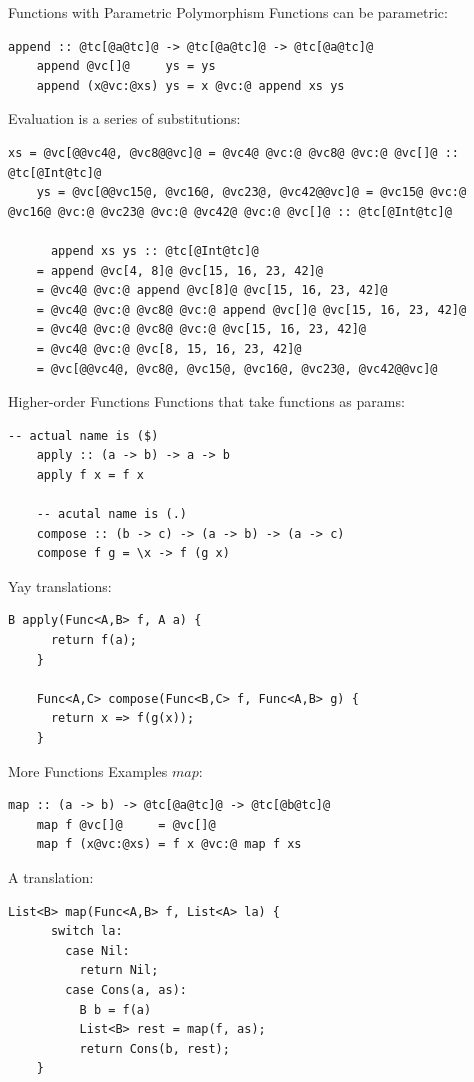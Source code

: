\documentclass[xcolor={usenames,dvipsnames}]{beamer}
\begin{document}
\begin{frame}[fragile]{Functions with Parametric Polymorphism}
  Functions can be parametric:
  \begin{lstlisting}[style=hask]
    append :: @tc[@a@tc]@ -> @tc[@a@tc]@ -> @tc[@a@tc]@
    append @vc[]@     ys = ys
    append (x@vc:@xs) ys = x @vc:@ append xs ys
  \end{lstlisting}

  Evaluation is a series of substitutions:
  \begin{lstlisting}[style=hask]
    xs = @vc[@@vc4@, @vc8@@vc]@ = @vc4@ @vc:@ @vc8@ @vc:@ @vc[]@ :: @tc[@Int@tc]@
    ys = @vc[@@vc15@, @vc16@, @vc23@, @vc42@@vc]@ = @vc15@ @vc:@ @vc16@ @vc:@ @vc23@ @vc:@ @vc42@ @vc:@ @vc[]@ :: @tc[@Int@tc]@

      append xs ys :: @tc[@Int@tc]@
    = append @vc[4, 8]@ @vc[15, 16, 23, 42]@
    = @vc4@ @vc:@ append @vc[8]@ @vc[15, 16, 23, 42]@
    = @vc4@ @vc:@ @vc8@ @vc:@ append @vc[]@ @vc[15, 16, 23, 42]@
    = @vc4@ @vc:@ @vc8@ @vc:@ @vc[15, 16, 23, 42]@
    = @vc4@ @vc:@ @vc[8, 15, 16, 23, 42]@
    = @vc[@@vc4@, @vc8@, @vc15@, @vc16@, @vc23@, @vc42@@vc]@
  \end{lstlisting}
\end{frame}

\begin{frame}[fragile]{Higher-order Functions}
  Functions that take functions as params:
  \begin{lstlisting}[style=hask]
    -- actual name is ($)
    apply :: (a -> b) -> a -> b
    apply f x = f x

    -- acutal name is (.)
    compose :: (b -> c) -> (a -> b) -> (a -> c)
    compose f g = \x -> f (g x)
  \end{lstlisting}

  \pause
  Yay translations:
  \begin{lstlisting}[style=hask]
    B apply(Func<A,B> f, A a) {
      return f(a);
    }

    Func<A,C> compose(Func<B,C> f, Func<A,B> g) {
      return x => f(g(x));
    }
  \end{lstlisting}
\end{frame}

\begin{frame}[fragile]{More Functions Examples}
  $map$:
  \begin{lstlisting}[style=hask]
    map :: (a -> b) -> @tc[@a@tc]@ -> @tc[@b@tc]@
    map f @vc[]@     = @vc[]@
    map f (x@vc:@xs) = f x @vc:@ map f xs
  \end{lstlisting}

  \pause
  A translation:
  \begin{lstlisting}[style=hask]
    List<B> map(Func<A,B> f, List<A> la) {
      switch la:
        case Nil:
          return Nil;
        case Cons(a, as):
          B b = f(a)
          List<B> rest = map(f, as);
          return Cons(b, rest);
    }
  \end{lstlisting}
\end{frame}
\end{document}
